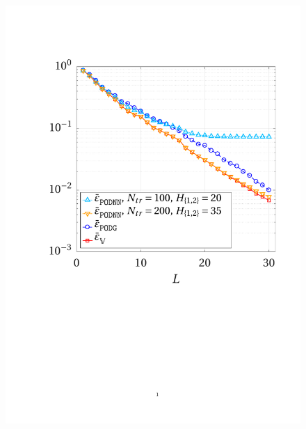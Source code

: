 \documentclass[longtitle]{elsarticle}
\numberwithin{equation}{section}
\theoremstyle{theorem}
\theoremstyle{definition}
\theoremstyle{remark}
\theoremstyle{proposition}
\numberwithin{figure}{section}
\begin{document}
		\begin{figure}[t!]
			\center
			\includegraphics[scale = 0.394, trim = {1.5cm 9.6cm 1.5cm 3.8cm}, clip]{poisson2d_error_vs_rank}
			\hspace*{0.8cm}

\end{figure}
\end{document}
